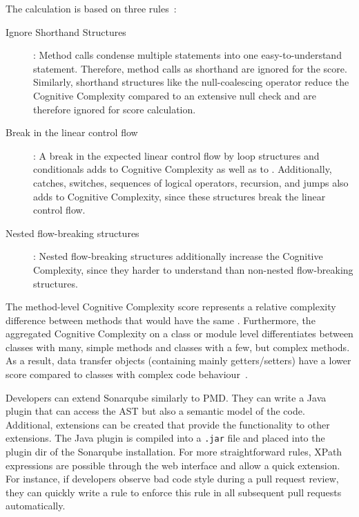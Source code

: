 The calculation is based on three rules~\cite{campbell2018cognitive}:
\begin{description}
    \item[Ignore Shorthand Structures]: Method calls condense multiple statements into one easy-to-understand statement. Therefore, method calls as shorthand are ignored for the score. Similarly, shorthand structures like the null-coalescing operator reduce the Cognitive Complexity compared to an extensive null check and are therefore ignored for score calculation.
    \item[Break in the linear control flow]: A break in the expected linear control flow by loop structures and conditionals adds to Cognitive Complexity as well as to . Additionally, catches, switches, sequences of logical operators, recursion, and jumps also adds to Cognitive Complexity, since these structures break the linear control flow.
    \item[Nested flow-breaking structures]: Nested flow-breaking structures additionally increase the Cognitive Complexity, since they harder to understand than non-nested flow-breaking structures.  
\end{description}
The method-level Cognitive Complexity score represents a relative complexity difference between methods that would have the same . Furthermore, the aggregated Cognitive Complexity on a class or module level differentiates between classes with many, simple methods and classes with a few, but complex methods. As a result, data transfer objects (containing mainly getters/setters) have a lower score compared to classes with complex code behaviour~\cite{campbell2018cognitive}.

Developers can extend Sonarqube similarly to PMD. They can write a Java plugin that can access the AST but also a semantic model of the code. Additional, extensions can be created that provide the functionality to other extensions. The Java plugin is compiled into a \texttt{.jar} file and placed into the plugin dir of the Sonarqube installation. For more straightforward rules, XPath expressions are possible through the web interface and allow a quick extension. For instance, if developers observe bad code style during a pull request review, they can quickly write a rule to enforce this rule in all subsequent pull requests automatically.

